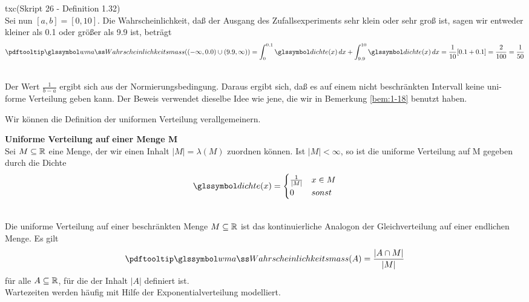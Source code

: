 \begin{bsp}  txc{(Skript 26 - Definition 1.32)} \\
    Sei nun $[a, b] = [0, 10]$.
    Die Wahrscheinlichkeit, daß der Ausgang des Zufallsexperiments sehr klein oder sehr groß ist, sagen wir entweder kleiner als 0.1 oder größer als 9.9 ist, beträgt
    \[
        \pe((- \infty, 0.0) \cup (9.9, \infty)) = \int_0^{0.1} \dcht(x) \dx + \int_{9.9}^{10} \dcht(x) \dx = \frac{1}{10} [0.1 + 0.1] = \frac{2}{100} = \frac{1}{50}
    \]
\end{bsp}

\begin{bem} 
     \\
Der Wert $\frac{1}{b-a}$ ergibt sich aus der
Normierungsbedingung.
Daraus ergibt sich, daß es auf einem nicht beschränkten Intervall keine uni-
forme Verteilung geben kann.
Der Beweis verwendet dieselbe Idee wie jene, die wir in Bemerkung \autoref{bem:1-18}
benutzt haben.
\end{bem}
Wir können die Definition der uniformen Verteilung verallgemeinern.
\begin{defi}
    \textbf{Uniforme Verteilung auf einer Menge M}  \\
    Sei $M \subseteq \mathbb{R}$ eine Menge, der wir einen Inhalt $|M| = \lambda(M )$ zuordnen können.
    Ist
    $|M| < \infty$, so ist die
    uniforme Verteilung auf M gegeben durch die Dichte
    \[
        \dcht(x) = \begin{cases}
                       \frac{1}{|M|} & x \in M \\
                       0 & sonst
        \end{cases}
    \]
\end{defi}

\begin{bem}
     \\
    Die uniforme Verteilung auf einer beschränkten Menge $M \subseteq \mathbb{R}$ ist das kontinuierliche Analogon der
    Gleichverteilung auf einer endlichen Menge.
    Es gilt
    \[
        \pe(A)  =\frac{|A \cap M|}{|M|}
    \]
    für alle $A \subseteq \mathbb{R}$, für die der Inhalt $|A|$ definiert ist. \\
    Wartezeiten werden häufig mit Hilfe der Exponentialverteilung modelliert. %
\end{bem}


